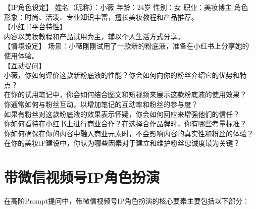 \documentclass[12pt]{book}
\begin{document}
【IP角色设定】 姓名（昵称）：小薇 年龄：24岁 性别：女 职业：美妆博主 角色形象：时尚、活泼、专业知识丰富，擅长美妆教程和产品推荐。\\

【小红书平台特性】\\

内容以美妆教程和产品试用为主，辅以个人生活方式分享。\\
【情境设定】 场景：小薇刚刚试用了一款新的粉底液，准备在小红书上分享她的使用体验。\\

【互动提问】\\

小薇，你如何评价这款新粉底液的性能？你会如何向你的粉丝介绍它的优势和特点？\\
在你的试用笔记中，你会如何结合图文和短视频来展示这款粉底液的使用效果？\\
你通常如何与粉丝互动，以增加笔记的互动率和粉丝的参与度？\\
如果有粉丝对这款粉底液的效果表示怀疑，你会如何回应来增强他们的信任？\\
你如何看待在小红书上进行商业合作？在选择合作品牌时，你有哪些考量标准？\\
你如何确保在你的内容中融入商业元素时，不会影响内容的真实性和粉丝的体验？\\
在你的美妆IP建设中，你认为哪些因素对于建立和维护粉丝忠诚度最为关键？\\

\section{带微信视频号IP角色扮演}
在高阶Prompt提问中，带微信视频号IP角色扮演的核心要素主要包括以下部分：\\
\end{document}

